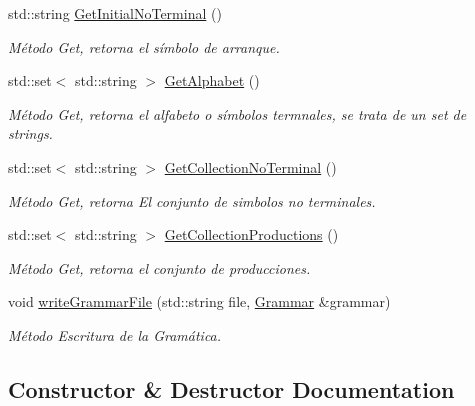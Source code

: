 \begin{DoxyCompactItemize}
\mbox{\label{classGrammar_a1163834f6d65a507ef16854c66edbf48}} 
std\+::string \hyperlink{classGrammar_a1163834f6d65a507ef16854c66edbf48}{Get\+Initial\+No\+Terminal} ()
\begin{DoxyCompactList}\small\item\em Método Get, retorna el símbolo de arranque. \end{DoxyCompactList}\item 
\mbox{\label{classGrammar_a23659466733a36d68b9864cd69f9b7c8}} 
std\+::set$<$ std\+::string $>$ \hyperlink{classGrammar_a23659466733a36d68b9864cd69f9b7c8}{Get\+Alphabet} ()
\begin{DoxyCompactList}\small\item\em Método Get, retorna el alfabeto o símbolos termnales, se trata de un set de strings. \end{DoxyCompactList}\item 
\mbox{\label{classGrammar_ad9aab9585932c1dfa779937460843f82}} 
std\+::set$<$ std\+::string $>$ \hyperlink{classGrammar_ad9aab9585932c1dfa779937460843f82}{Get\+Collection\+No\+Terminal} ()
\begin{DoxyCompactList}\small\item\em Método Get, retorna El conjunto de simbolos no terminales. \end{DoxyCompactList}\item 
\mbox{\label{classGrammar_a027ab18d2e27e12b67991b408535b427}} 
std\+::set$<$ std\+::string $>$ \hyperlink{classGrammar_a027ab18d2e27e12b67991b408535b427}{Get\+Collection\+Productions} ()
\begin{DoxyCompactList}\small\item\em Método Get, retorna el conjunto de producciones. \end{DoxyCompactList}\item 
void \hyperlink{classGrammar_a1b8915ce3d5677b2bf7272dd59b89512}{write\+Grammar\+File} (std\+::string file, \hyperlink{classGrammar}{Grammar} \&grammar)
\begin{DoxyCompactList}\small\item\em Método Escritura de la Gramática. \end{DoxyCompactList}\end{DoxyCompactItemize}


\subsection{Constructor \& Destructor Documentation}
\mbox{\label{classGrammar_aa201250a002a7d07d398fee189a74427}} 
